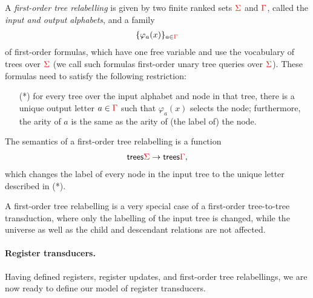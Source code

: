 \begin{definition} \label{def:forat}  A \emph{first-order tree relabelling} is given by two finite ranked sets ${\color{red}{\Sigma}}$ and ${\color{red}{\Gamma}}$, called the \emph{input and output alphabets}, and a family 
    \begin{align*}
    \{\varphi_a(x)\}_{a \in {\color{red}{\Gamma}}}
    \end{align*}
    of first-order formulas, which have one free variable and use the vocabulary of trees over  ${\color{red}{\Sigma}}$ (we call such formulas first-order  unary tree queries over ${\color{red}{\Sigma}}$). These formulas need to satisfy the following restriction:
    \begin{enumerate}
        \item[(*)] for every tree over the input alphabet and node in that tree, there is a unique output letter $a \in {\color{red}{\Gamma}}$ such that $\varphi_a(x)$ selects the node; furthermore, the arity of $a$ is the same as the arity of (the label of) the node. 
    \end{enumerate}
The semantics of a  first-order tree relabelling is a function 
\begin{align*}
\mathsf {trees} {\color{red}{\Sigma}} \to \mathsf {trees} {\color{red}{\Gamma}},
\end{align*}
which changes the label of every node in the input tree to the unique letter described in  (*). 
      \end{definition}


A first-order tree relabelling is a very special case of a first-order tree-to-tree transduction, where only the labelling of the input tree is changed, while the universe as well as the child and descendant relations are not affected. 

\paragraph*{Register transducers.} Having defined registers, register updates, and first-order tree relabellings, we are now ready to define our model of register transducers.


